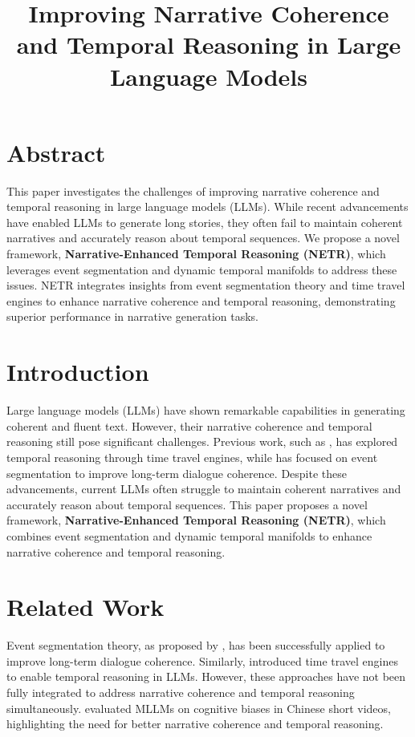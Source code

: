 \documentclass{article}
\title{Improving Narrative Coherence and Temporal Reasoning in Large Language Models}
\author{}
\date{}
\begin{document}
\maketitle

\section{Abstract}
This paper investigates the challenges of improving narrative coherence and temporal reasoning in large language models (LLMs). While recent advancements have enabled LLMs to generate long stories, they often fail to maintain coherent narratives and accurately reason about temporal sequences. We propose a novel framework, \textbf{Narrative-Enhanced Temporal Reasoning (NETR)}, which leverages event segmentation and dynamic temporal manifolds to address these issues. NETR integrates insights from event segmentation theory and time travel engines to enhance narrative coherence and temporal reasoning, demonstrating superior performance in narrative generation tasks.

\section{Introduction}
Large language models (LLMs) have shown remarkable capabilities in generating coherent and fluent text. However, their narrative coherence and temporal reasoning still pose significant challenges. Previous work, such as \cite{an2026timetravelengineshared}, has explored temporal reasoning through time travel engines, while \cite{zou2026esmemeventsegmentationbasedmemory} has focused on event segmentation to improve long-term dialogue coherence. Despite these advancements, current LLMs often struggle to maintain coherent narratives and accurately reason about temporal sequences. This paper proposes a novel framework, \textbf{Narrative-Enhanced Temporal Reasoning (NETR)}, which combines event segmentation and dynamic temporal manifolds to enhance narrative coherence and temporal reasoning.

\section{Related Work}
Event segmentation theory, as proposed by \cite{zou2026esmemeventsegmentationbasedmemory}, has been successfully applied to improve long-term dialogue coherence. Similarly, \cite{an2026timetravelengineshared} introduced time travel engines to enable temporal reasoning in LLMs. However, these approaches have not been fully integrated to address narrative coherence and temporal reasoning simultaneously. \cite{huang2026probingmultimodallargelanguage} evaluated MLLMs on cognitive biases in Chinese short videos, highlighting the need for better narrative coherence and temporal reasoning. 
\end{document}

